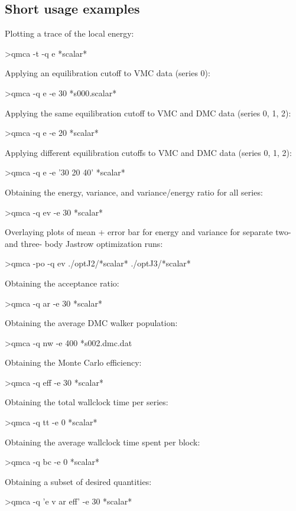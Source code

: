 \subsection{Short usage examples}
\label{sec:qmca_short_examples}
\noindent
Plotting a trace of the local energy:
\begin{shade}
>qmca -t -q e *scalar*
\end{shade}
\noindent
Applying an equilibration cutoff to VMC data (series 0):
\begin{shade}
>qmca -q e -e 30 *s000.scalar*
\end{shade}
\noindent
Applying the same equilibration cutoff to VMC and DMC data (series 0, 1, 2):
\begin{shade}
>qmca -q e -e 20 *scalar*
\end{shade}
\noindent
Applying different equilibration cutoffs to VMC and DMC data (series 0, 1, 2):
\begin{shade}
>qmca -q e -e '30 20 40' *scalar*
\end{shade}
\noindent
Obtaining the energy, variance, and variance/energy ratio for all series:
\begin{shade}
>qmca -q ev -e 30 *scalar*
\end{shade}
\noindent
Overlaying plots of mean + error bar for energy and variance for separate 
two- and three- body Jastrow optimization runs:
\begin{shade}
>qmca -po -q ev ./optJ2/*scalar* ./optJ3/*scalar*
\end{shade}
\noindent
Obtaining the acceptance ratio:
\begin{shade}
>qmca -q ar -e 30 *scalar*
\end{shade}
\noindent
Obtaining the average DMC walker population:
\begin{shade}
>qmca -q nw -e 400 *s002.dmc.dat
\end{shade}
\noindent
Obtaining the Monte Carlo efficiency:
\begin{shade}
>qmca -q eff -e 30 *scalar*
\end{shade}
\noindent
Obtaining the total wallclock time per series:
\begin{shade}
>qmca -q tt -e 0 *scalar*
\end{shade}
\noindent
Obtaining the average wallclock time spent per block:
\begin{shade}
>qmca -q bc -e 0 *scalar*
\end{shade}
\noindent
Obtaining a subset of desired quantities:
\begin{shade}
>qmca -q 'e v ar eff' -e 30 *scalar*
\end{shade}

